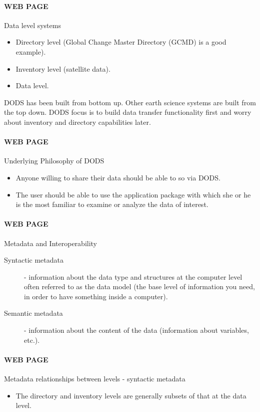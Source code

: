 \paragraph{WEB PAGE}  Data level systems
\begin{itemize}
\item Directory level (Global Change Master Directory (GCMD) is a good example).
\item Inventory level (satellite data).
\item Data level.
\end{itemize}

DODS has been built from bottom up.  Other earth science systems are
built from the top down.  DODS focus is to build data transfer
functionality first and worry about inventory and directory
capabilities later.

\paragraph{WEB PAGE}  Underlying Philosophy of DODS
\begin{itemize}
\item Anyone willing to share their data should be able to so via DODS.
\item The user should be able to use the application package with
  which she or he is the most familiar to examine or analyze the data
  of interest.
\end{itemize}

\paragraph{WEB PAGE}  Metadata and Interoperability
\begin{description}
\item[Syntactic metadata] - information about the data type and
  structures at the computer level often referred to as the data model
  (the base level of information you need, in order to have something
  inside a computer).  
\item[Semantic metadata] - information about the content of the data
  (information about variables, etc.).
\end{description}

\paragraph{WEB PAGE}  Metadata relationships between levels - syntactic metadata
\begin{itemize}
\item The directory and inventory levels are generally subsets of that
  at the data level.
\end{itemize}

